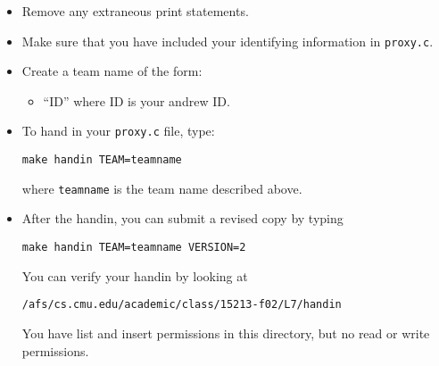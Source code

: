\documentclass[11pt]{article}
\begin{document}
\begin{itemize}
\item Remove any extraneous print statements.
\item Make sure that you have included your identifying information in
  \texttt{proxy.c}.  
\item Create a team name of the form:
  \begin{itemize}
  \item ``ID'' where ID is your andrew ID.
  \end{itemize}
\item To hand in your \texttt{proxy.c} file, type:

\begin{verbatim}
make handin TEAM=teamname
\end{verbatim}

  where \texttt{teamname} is the team name described above.

\item After the handin, you can submit a revised copy by typing

\begin{verbatim}
make handin TEAM=teamname VERSION=2
\end{verbatim}

You can verify your handin by looking at

\begin{verbatim}
/afs/cs.cmu.edu/academic/class/15213-f02/L7/handin
\end{verbatim}
You have list and insert permissions in this directory, but no
read or write permissions.

\end{itemize}
\end{document}
